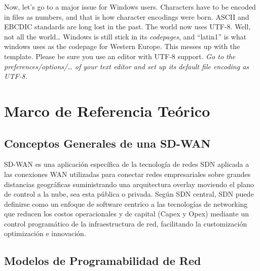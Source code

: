 Now, let's go to a major issue for Windows users.  Characters have to be encoded in files as numbers, and that is how character encodings were born. ASCII and EBCDIC standards are long lost in the past.  The world now uses UTF-8.  Well, not all the world… Windows is still stick in its \emph{codepages}, and “latin1” is what windows uses as the codepage for Western Europe. This messes up with the template. Please be sure you use an editor with UTF-8 support.  \emph{Go to the preferences/options/… of your text editor and set up its default file encoding as UTF-8.}


\section{Marco de Referencia Teórico} %
\label{sec:Marco de Referencia Teórico}

\subsection{Conceptos Generales de una SD-WAN}
\label{sec:Conceptos Generales de una SD-WAN}
SD-WAN es una aplicación específica de la tecnología de redes SDN aplicada a las conexiones WAN utilizadas para conectar redes empresariales sobre grandes distancias geográficas suministrando una arquitectura overlay moviendo el plano de control a la nube, sea esta pública o privada. Según SDN central, SDN puede definirse como un enfoque de software centrico a las tecnologías de networking que reducen los costos operacionales y de capital (Capex y Opex) mediante un control programático de la infraestructura de red, facilitando la customización optimización e innovación.
\\
\subsection{Modelos de Programabilidad de Red}
\label{sec:Modelos de Programabilidad de Red}

